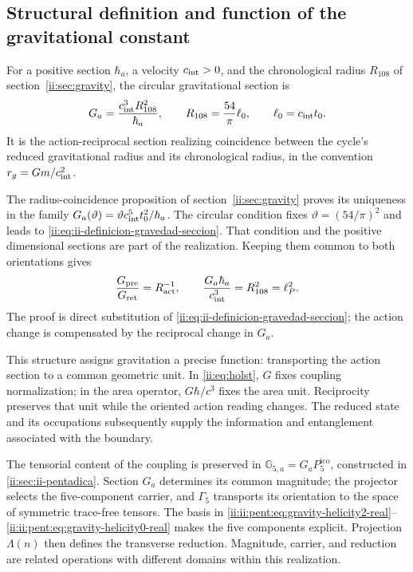 \subsection{Structural definition and function of the gravitational constant}
\label{ii:sec:ii-definicion-gravedad}

\begin{definition}
For a positive section \(\hbar_a\), a velocity
\(c_{\rm int}>0\), and the chronological radius \(R_{108}\) of
section~\ref{ii:sec:gravity}, the circular gravitational section is
\begin{equation}
 G_a=\frac{c_{\rm int}^{3}R_{108}^{2}}{\hbar_a},
 \qquad R_{108}=\frac{54}{\pi}\ell_0,
 \qquad \ell_0=c_{\rm int}t_0.
 \label{ii:eq:ii-definicion-gravedad-seccion}
\end{equation}
It is the action-reciprocal section realizing coincidence
between the cycle's reduced gravitational radius and its
chronological radius, in the convention \(r_g=Gm/c_{\rm int}^2\).
\end{definition}

The radius-coincidence proposition of
section~\ref{ii:sec:gravity} proves its uniqueness in the family
\(G_a(\vartheta)=\vartheta c_{\rm int}^{5}t_0^2/\hbar_a\).
The circular condition fixes \(\vartheta=(54/\pi)^2\) and leads
to \eqref{ii:eq:ii-definicion-gravedad-seccion}. That condition and the
positive dimensional sections are part of the realization.
Keeping them common to both orientations gives
\begin{equation}
 \frac{G_{\mathrm{pre}}}{G_{\mathrm{ret}}}
 =R_{\mathrm{act}}^{-1},
 \qquad
 \frac{G_a\hbar_a}{c_{\rm int}^{3}}
 =R_{108}^{2}=\ell_P^2.
 \label{ii:eq:ii-definicion-gravedad-area}
\end{equation}
The proof is direct substitution of
\eqref{ii:eq:ii-definicion-gravedad-seccion}; the action change
is compensated by the reciprocal change in \(G_a\).

This structure assigns gravitation a precise function:
transporting the action section to a common geometric unit.
In \eqref{ii:eq:holst}, \(G\) fixes coupling normalization;
in the area operator, \(G\hbar/c^3\) fixes the area unit.
Reciprocity preserves that unit while the oriented action
reading changes. The reduced state and its occupations subsequently supply
the information and entanglement associated with the boundary.

The tensorial content of the coupling is preserved in
\(\mathbb G_{5,a}=G_aP^{\mathrm{ico}}_5\), constructed in
\ref{ii:sec:ii-pentadica}. Section \(G_a\) determines its common magnitude;
the projector selects the five-component carrier, and \(\Gamma_5\)
transports its orientation to the space of symmetric trace-free tensors.
The basis in \eqref{ii:ii:pent:eq:gravity-helicity2-real}--\eqref{ii:ii:pent:eq:gravity-helicity0-real}
makes the five components explicit. Projection \(\Lambda(n)\) then defines
the transverse reduction. Magnitude, carrier, and reduction are
related operations with different domains within this realization.
